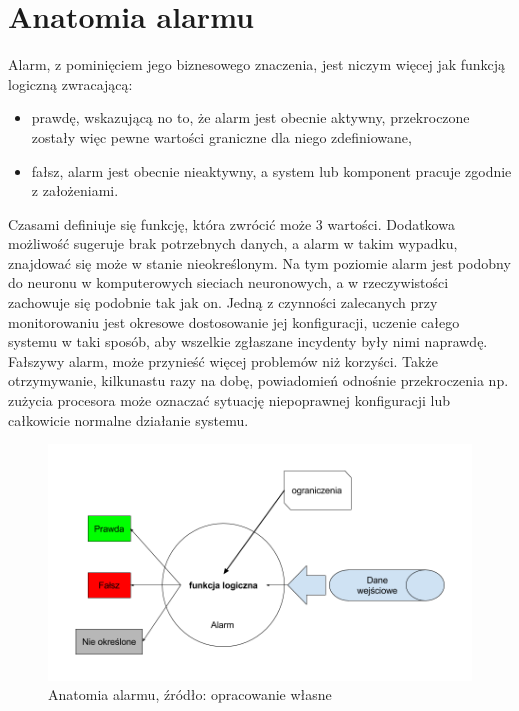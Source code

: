 \section{Anatomia alarmu}
\label{chapter:monitoring:anatomy_of_alarm}

    Alarm, z pominięciem jego biznesowego znaczenia, jest niczym więcej jak funkcją logiczną zwracającą:
    \begin{itemize}
        \item prawdę, wskazującą no to, że alarm jest obecnie aktywny, przekroczone zostały więc
        pewne wartości graniczne dla niego zdefiniowane,
        \item fałsz, alarm jest obecnie nieaktywny, a system lub komponent pracuje zgodnie z założeniami.
    \end{itemize}
    Czasami definiuje się funkcję, która zwrócić może 3 wartości. Dodatkowa możliwość sugeruje brak 
    potrzebnych danych, a alarm w takim wypadku, znajdować się może w stanie nieokreślonym. Na tym poziomie alarm
    jest podobny do neuronu w komputerowych sieciach neuronowych, a w rzeczywistości zachowuje się podobnie tak jak on.
    Jedną z czynności zalecanych przy monitorowaniu jest okresowe dostosowanie jej konfiguracji, uczenie całego
    systemu w taki sposób, aby wszelkie zgłaszane incydenty były nimi naprawdę. Fałszywy alarm, może
    przynieść więcej problemów niż korzyści. Także otrzymywanie, kilkunastu razy na dobę, powiadomień odnośnie przekroczenia np. zużycia
    procesora może oznaczać sytuację niepoprawnej konfiguracji
    lub całkowicie normalne działanie systemu.
    
    \begin{figure}[H]
        \centering
        \includegraphics[width=1.0\textwidth]{images/alarm_anatomy}
        \caption[Anatomia alarmu]{Anatomia alarmu, źródło: {opracowanie własne}}
        \label{chapter:monitoring:anatomy_of_alarm:picture}
    \end{figure}
   
